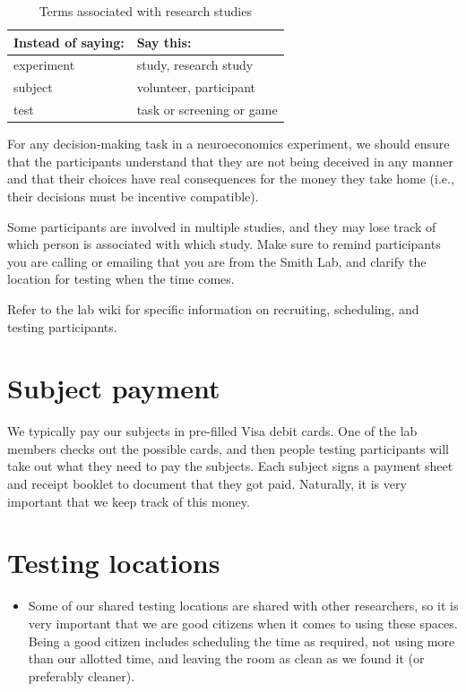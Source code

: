 \documentclass[letterpaper,12pt,oneside]{memoir}
\begin{document}
{%
\begin{table}
\centering
\caption{Terms associated with research studies}
\begin{tabular}{ll}
\toprule
Instead of saying: & Say this:\\
\midrule
experiment& study, research study\\
subject& volunteer, participant\\
test & task or screening or game \\
\bottomrule
\end{tabular}
\end{table}

For any decision-making task in a neuroeconomics experiment, we should ensure that the participants understand that they are not being deceived in any manner and that their choices have real consequences for the money they take home (i.e., their decisions must be incentive compatible). 

Some participants are involved in multiple studies, and they may lose track of which person is associated with which study. Make sure to remind participants you are calling or emailing that you are from the Smith Lab, and clarify the location for testing when the time comes.

Refer to the lab wiki for specific information on recruiting, scheduling, and testing participants.


\section{Subject payment}
\label{sec:subject_payment}

We typically pay our subjects in pre-filled Visa debit cards. One of the lab members checks out the possible cards, and then people testing participants will take out what they need to pay the subjects. Each subject signs a payment sheet and receipt booklet to document that they got paid. Naturally, it is very important that we keep track of this money.



\section{Testing locations}
\label{sec:testing_locations}

\begin{itemize}
\item Some of our shared testing locations are shared with other researchers, so it is very important that we are good citizens when it comes to using these spaces. Being a good citizen includes scheduling the time as required, not using more than our allotted time, and leaving the room as clean as we found it (or preferably cleaner).


\end{itemize}}
\end{document}
